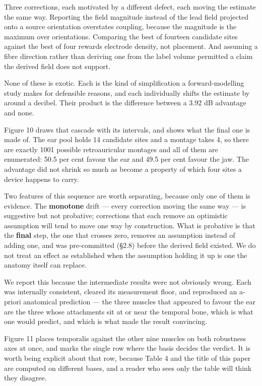 \documentclass[
  11pt,
  letterpaper,
]{article}
\newcounter{none} %
\begin{document}
Three corrections, each motivated by a different defect, each moving the
estimate the same way. Reporting the field magnitude instead of the lead field
projected onto a source orientation overstates coupling, because the magnitude
is the maximum over orientations. Comparing the best of fourteen candidate sites
against the best of four rewards electrode density, not placement. And assuming
a fibre direction rather than deriving one from the label volume permitted a
claim the derived field does not support.

None of these is exotic. Each is the kind of simplification a forward-modelling
study makes for defensible reasons, and each individually shifts the estimate by
around a decibel. Their product is the difference between a 3.92 dB advantage and
none.

Figure 10 draws that cascade with its intervals, and shows what the final one is
made of. The ear pool holds 14 candidate sites and a montage takes 4, so there
are exactly 1001 possible retroauricular montages and all of them are
enumerated: 50.5 per cent favour the ear and 49.5 per cent favour the jaw. The
advantage did not shrink so much as become a property of which four sites a
device happens to carry.

Two features of this sequence are worth separating, because only one of them is
evidence. The \textbf{monotone} drift --- every correction moving the same way --- is
suggestive but not probative; corrections that each remove an optimistic
assumption will tend to move one way by construction. What is probative is that
the \textbf{final} step, the one that crosses zero, removes an assumption instead of
adding one, and was pre-committed (§2.8) before the derived field existed. We do
not treat an effect as established when the assumption holding it up is one the
anatomy itself can replace.

We report this because the intermediate results were not obviously wrong. Each
was internally consistent, cleared its measurement floor, and reproduced an
a-priori anatomical prediction --- the three muscles that appeared to favour the
ear are the three whose attachments sit at or near the temporal bone, which is
what one would predict, and which is what made the result convincing.

Figure 11 places temporalis against the other nine muscles on both robustness
axes at once, and marks the single row where the basis decides the verdict. It
is worth being explicit about that row, because Table 4 and the title of this
paper are computed on different bases, and a reader who sees only the table will
think they disagree.
\end{document}
